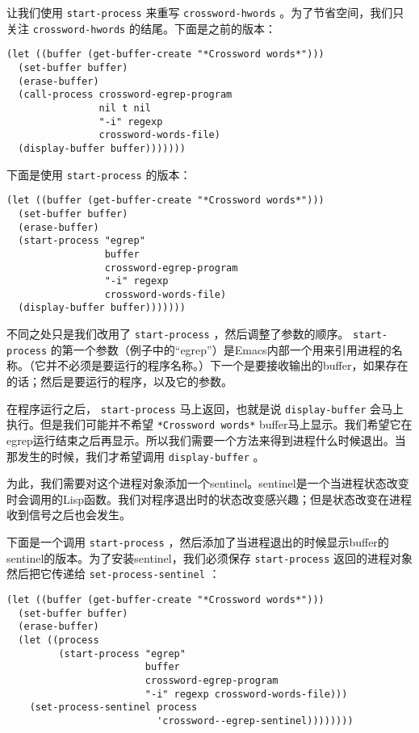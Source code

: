 让我们使用 \texttt{start-process} 来重写 \texttt{crossword-hwords} 。为了节省空间，我们只关注 \texttt{crossword-hwords} 的结尾。下面是之前的版本：

\begin{verbatim}
(let ((buffer (get-buffer-create "*Crossword words*")))
  (set-buffer buffer)
  (erase-buffer)
  (call-process crossword-egrep-program
                nil t nil
                "-i" regexp
                crossword-words-file)
  (display-buffer buffer)))))))
\end{verbatim}

下面是使用 \texttt{start-process} 的版本：

\begin{verbatim}
(let ((buffer (get-buffer-create "*Crossword words*")))
  (set-buffer buffer)
  (erase-buffer)
  (start-process "egrep"
                 buffer
                 crossword-egrep-program
                 "-i" regexp
                 crossword-words-file)
  (display-buffer buffer)))))))
\end{verbatim}

不同之处只是我们改用了 \texttt{start-process} ，然后调整了参数的顺序。 \texttt{start-process} 的第一个参数（例子中的“egrep”）是Emacs内部一个用来引用进程的名称。（它并不必须是要运行的程序名称。）下一个是要接收输出的buffer，如果存在的话；然后是要运行的程序，以及它的参数。

在程序运行之后， \texttt{start-process} 马上返回，也就是说 \texttt{display-buffer} 会马上执行。但是我们可能并不希望 \texttt{*Crossword words*} buffer马上显示。我们希望它在egrep运行结束之后再显示。所以我们需要一个方法来得到进程什么时候退出。当那发生的时候，我们才希望调用 \texttt{display-buffer} 。

为此，我们需要对这个进程对象添加一个sentinel。sentinel是一个当进程状态改变时会调用的Lisp函数。我们对程序退出时的状态改变感兴趣；但是状态改变在进程收到信号之后也会发生。

下面是一个调用 \texttt{start-process} ，然后添加了当进程退出的时候显示buffer的sentinel的版本。为了安装sentinel，我们必须保存 \texttt{start-process} 返回的进程对象然后把它传递给 \texttt{set-process-sentinel} ：

\begin{verbatim}
(let ((buffer (get-buffer-create "*Crossword words*")))
  (set-buffer buffer)
  (erase-buffer)
  (let ((process
         (start-process "egrep"
                        buffer
                        crossword-egrep-program
                        "-i" regexp crossword-words-file)))
    (set-process-sentinel process
                          'crossword--egrep-sentinel))))))))
\end{verbatim}

